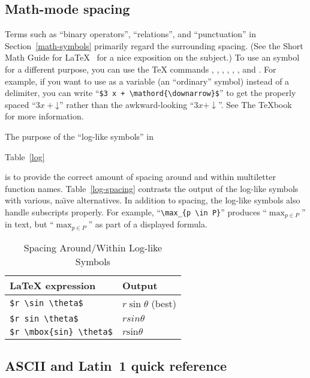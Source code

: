 \documentclass{article}
\newcommand{\latex}{\LaTeX\index{LaTeX=\LaTeX}\xspace}
\newcommand{\TeXbook}{%
  The \TeX{}book\index{TeXbook, The=\TeX{}book, The}~\cite{Knuth:ct-a}\xspace}
\newif\ifAMS
\newcommand{\midrule}{\hline}
\newcommand{\bottomrule}{\hline}
\newcommand{\indexcommand}[1]{%
  \edef\sanitized{\expandafter\sanitize\string#1!!!}%
  \expandafter\index\expandafter{\sanitized=\string\verb+\string#1+}%
}
\def\cmd#1{\texttt{\string#1}\indexcommand{#1}}
\newenvironment{nonsymtable}[1]{%
  \begin{table}[htbp]
  \centering
  \caption{#1}\medskip
}{%
  \end{table}
}
\begin{document}
\subsection{Math-mode spacing}
\label{math-spacing}

Terms such as ``binary operators'', ``relations'', and ``punctuation''
in Section~\ref{math-symbols} primarily regard the surrounding spacing.
(See the Short Math Guide for \latex~\cite{Downes:smg} for a nice
exposition on the subject.)  To use an symbol for a different purpose,
you can use the \TeX{} commands \cmd{\mathord}, \cmd{\mathop},
\cmd{\mathbin}, \cmd{\mathrel}, \cmd{\mathopen}, \cmd{\mathclose}, and
\cmd{\mathpunct}.  For example, if you want to use \cmd{\downarrow} as a
variable (an ``ordinary'' symbol) instead of a delimiter, you can write
``\verb|$3 x + \mathord{\downarrow}$|'' to get the properly spaced ``$3
x + \mathord{\downarrow}$'' rather than the awkward-looking ``$3 x +
\downarrow$''.  See \TeXbook for more information.

The purpose of the ``log-like symbols'' in
\ifAMS
  Tables~\ref{log} and~\ref{ams-log}
\else
  Table~\ref{log}
\fi
is to provide the correct amount of spacing around and within
multiletter function names.  Table~\vref{log-spacing} contrasts the
output of the log-like symbols with various, na\"{\i}ve alternatives.
In addition to spacing, the log-like symbols also handle subscripts
properly.  For example, ``\verb|\max_{p \in P}|'' produces ``$\max_{p
\in P}$'' in text, but ``$\displaystyle\max_{p \in P}$'' as part of a
displayed formula.

\begin{nonsymtable}{Spacing Around/Within Log-like Symbols}
\label{log-spacing}
\setlength{\tabcolsep}{1em}
\begin{tabular}{@{}ll@{}} \toprule
\latex{} expression & Output \\ \midrule
\verb|$r \sin \theta$|       & $r \sin \theta$ (best) \\
\verb|$r sin \theta$|        & $r sin \theta$         \\
\verb|$r \mbox{sin} \theta$| & $r \mbox{sin} \theta$  \\
\bottomrule
\end{tabular}
\end{nonsymtable}


\subsection{ASCII and Latin~1 quick reference}
\label{ascii-quickref}
\end{document}
